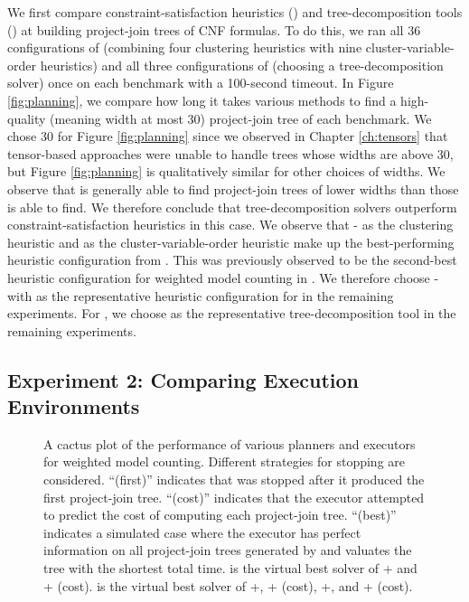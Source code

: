 We first compare constraint-satisfaction heuristics (\Htb) and tree-decomposition tools (\Lg) at building project-join trees of CNF formulas.
To do this, we ran all 36 configurations of \Htb{} (combining four clustering heuristics with nine cluster-variable-order heuristics) and all three configurations of \Lg{} (choosing a tree-decomposition solver) once on each benchmark with a 100-second timeout.
In Figure \ref{fig:planning}, we compare how long it takes various methods to find a high-quality (meaning width at most 30) project-join tree of each benchmark.
We chose 30 for Figure \ref{fig:planning} since we observed in Chapter \ref{ch:tensors} that tensor-based approaches were unable to handle trees whose widths are above 30, but Figure \ref{fig:planning} is qualitatively similar for other choices of widths.
We observe that \Lg{} is generally able to find project-join trees of lower widths than those \Htb{} is able to find.
We therefore conclude that tree-decomposition solvers outperform constraint-satisfaction heuristics in this case.
We observe that \Be-\TreeH{} as the clustering heuristic and \Invlexp{} as the cluster-variable-order heuristic make up the best-performing heuristic configuration from \Htb.
This was previously observed to be the second-best heuristic configuration for weighted model counting in \cite{DPV20}.
We therefore choose \Be-\TreeH{} with \Invlexp{} as the representative heuristic configuration for \Htb{} in the remaining experiments.
For \Lg{}, we choose \Flowcutter{} as the representative tree-decomposition tool in the remaining experiments.


\subsection{Experiment 2: Comparing Execution Environments}
\label{sec_experiments_execution}

\begin{figure}[t]
	\centering
	
    \vspace*{-1cm}
	\caption{
	A cactus plot of the performance of various planners and executors for weighted model counting.
    Different strategies for stopping \Lg{} are considered.
    ``(first)'' indicates that \Lg{} was stopped after it produced the first project-join tree.
    ``(cost)'' indicates that the executor attempted to predict the cost of computing each project-join tree.
    ``(best)'' indicates a simulated case where the executor has perfect information on all project-join trees generated by \Lg{} and valuates the tree with the shortest total time.
     is the virtual best solver of \Dmc{}+\Htb{} and \Dmc{}+\Lg{} (cost).
	 is the virtual best solver of \Dmc{}+\Htb{}, \Dmc{}+\Lg{} (cost), \Tensor{}+\Htb{}, and \Tensor{}+\Lg{} (cost).}
	\label{fig:execution}
\end{figure}

